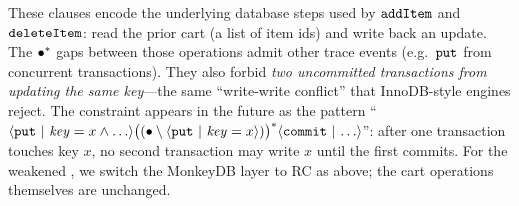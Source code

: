 \vspace{-.35cm}\par{}
\vspace{-.4cm}\par\nobreak\noindent
These clauses encode the underlying database steps used by $\boldsymbol{{\tt addItem}}$ and $\boldsymbol{{\tt deleteItem}}$: read the prior cart (a list of item ids) and write back an update. The ${\bullet^*}$ gaps between those operations admit other trace events (e.g.\ $\boldsymbol{{\tt put}}$ from concurrent transactions). They also forbid \emph{two uncommitted transactions from updating the same key}---the same ``write-write conflict'' that InnoDB-style engines reject. The constraint appears in the future as the pattern ``${\langle} {\boldsymbol{{\tt put}}~|~{\mathit{key}=x \land \ldots}} {\rangle}{\bigl((\bullet \setminus {   {\langle} {\boldsymbol{{\tt put}}~|~{\mathit{key}=x}}  {\rangle} })\bigr)^{\ast}}{\langle} {\boldsymbol{{\tt commit}}~|~{\ldots}} {\rangle}$'': after one transaction touches key $x$, no second transaction may write $x$ until the first commits. For the weakened \tyName{}, we switch the MonkeyDB layer to RC as above; the cart operations themselves are unchanged.


